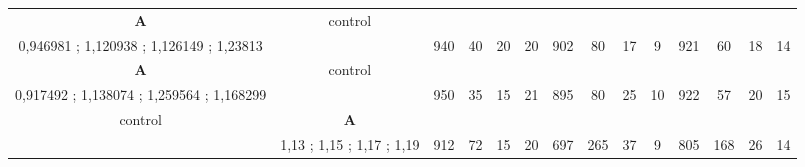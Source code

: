 \begin{table}[H]
{\begin{tabular}{|c|c|c|c|c|c|c|c|c|c|c|c|c|c|}
\cellcolor{blue!15}\textbf{A} & control& {\color[HTML]{00009B} } & {\color[HTML]{9A0000} } & {\color[HTML]{009901} } &  & {\color[HTML]{00009B} } & {\color[HTML]{9A0000} } & {\color[HTML]{009901} } &  & {\color[HTML]{00009B} } & {\color[HTML]{9A0000} } & {\color[HTML]{009901} } &  \\ 
\cellcolor{ blue!15}0,946981 ; 1,120938 ; 1,126149 ; 1,23813 &  & \multirow{-2}{*}{{\color[HTML]{00009B} 940}} & \multirow{-2}{*}{{\color[HTML]{9A0000} 40}} & \multirow{-2}{*}{{\color[HTML]{009901} 20}} & \multirow{-2}{*}{20} & \multirow{-2}{*}{{\color[HTML]{00009B} 902}} & \multirow{-2}{*}{{\color[HTML]{9A0000} 80}} & \multirow{-2}{*}{{\color[HTML]{009901} 17}} & \multirow{-2}{*}{9} & \multirow{-2}{*}{{\color[HTML]{00009B} 921}} & \multirow{-2}{*}{{\color[HTML]{9A0000} 60}} & \multirow{-2}{*}{{\color[HTML]{009901} 18}} & \multirow{-2}{*}{14} \\ \hline

\cellcolor{blue!15}\textbf{A} & control& {\color[HTML]{00009B} } & {\color[HTML]{9A0000} } & {\color[HTML]{009901} } &  & {\color[HTML]{00009B} } & {\color[HTML]{9A0000} } & {\color[HTML]{009901} } &  & {\color[HTML]{00009B} } & {\color[HTML]{9A0000} } & {\color[HTML]{009901} } &  \\ 
\cellcolor{ blue!15}0,917492 ; 1,138074 ; 1,259564 ; 1,168299 &  & \multirow{-2}{*}{{\color[HTML]{00009B} 950}} & \multirow{-2}{*}{{\color[HTML]{9A0000} 35}} & \multirow{-2}{*}{{\color[HTML]{009901} 15}} & \multirow{-2}{*}{21} & \multirow{-2}{*}{{\color[HTML]{00009B} 895}} & \multirow{-2}{*}{{\color[HTML]{9A0000} 80}} & \multirow{-2}{*}{{\color[HTML]{009901} 25}} & \multirow{-2}{*}{10} & \multirow{-2}{*}{{\color[HTML]{00009B} 922}} & \multirow{-2}{*}{{\color[HTML]{9A0000} 57}} & \multirow{-2}{*}{{\color[HTML]{009901} 20}} & \multirow{-2}{*}{15} \\ \hline

control & \cellcolor{blue!15}\textbf{A}& {\color[HTML]{00009B} } & {\color[HTML]{9A0000} } & {\color[HTML]{009901} } &  & {\color[HTML]{00009B} } & {\color[HTML]{9A0000} } & {\color[HTML]{009901} } &  & {\color[HTML]{00009B} } & {\color[HTML]{9A0000} } & {\color[HTML]{009901} } &  \\ 
 & \cellcolor{ blue!15}1,13 ; 1,15 ; 1,17 ; 1,19 & \multirow{-2}{*}{{\color[HTML]{00009B} 912}} & \multirow{-2}{*}{{\color[HTML]{9A0000} 72}} & \multirow{-2}{*}{{\color[HTML]{009901} 15}} & \multirow{-2}{*}{20} & \multirow{-2}{*}{{\color[HTML]{00009B} 697}} & \multirow{-2}{*}{{\color[HTML]{9A0000} 265}} & \multirow{-2}{*}{{\color[HTML]{009901} 37}} & \multirow{-2}{*}{9} & \multirow{-2}{*}{{\color[HTML]{00009B} 805}} & \multirow{-2}{*}{{\color[HTML]{9A0000} 168}} & \multirow{-2}{*}{{\color[HTML]{009901} 26}} & \multirow{-2}{*}{14} \\ \hline


\end{tabular}}
\end{table}
